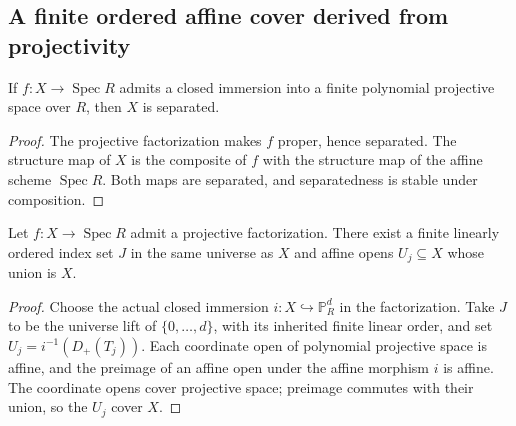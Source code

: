 \subsection{A finite ordered affine cover derived from projectivity}

\begin{lemma}
\label{lem:fc-projective-source-separated}
\leanok
{}
If $f:X\to\operatorname{Spec}R$ admits a closed immersion into a finite
polynomial projective space over $R$, then $X$ is separated.
\end{lemma}
\begin{proof}
The projective factorization makes $f$ proper, hence separated. The
structure map of $X$ is the composite of $f$ with the structure map of
the affine scheme $\operatorname{Spec}R$. Both maps are separated, and
separatedness is stable under composition.
\end{proof}

\begin{lemma}
\label{lem:fc-projective-finite-ordered-affine-cover}
\leanok
{}
Let $f:X\to\operatorname{Spec}R$ admit a projective factorization.
There exist a finite linearly ordered index set $J$ in the same universe
as $X$ and affine opens $U_j\subseteq X$ whose union is $X$.
\end{lemma}
\begin{proof}
Choose the actual closed immersion $i:X\hookrightarrow\mathbb P^d_R$
in the factorization. Take $J$ to be the universe lift of
$\{0,\ldots,d\}$, with its inherited finite linear order, and set
$U_j=i^{-1}(D_+(T_j))$. Each coordinate open of polynomial projective
space is affine, and the preimage of an affine open under the affine
morphism $i$ is affine. The coordinate opens cover projective space;
preimage commutes with their union, so the $U_j$ cover $X$.
\end{proof}
